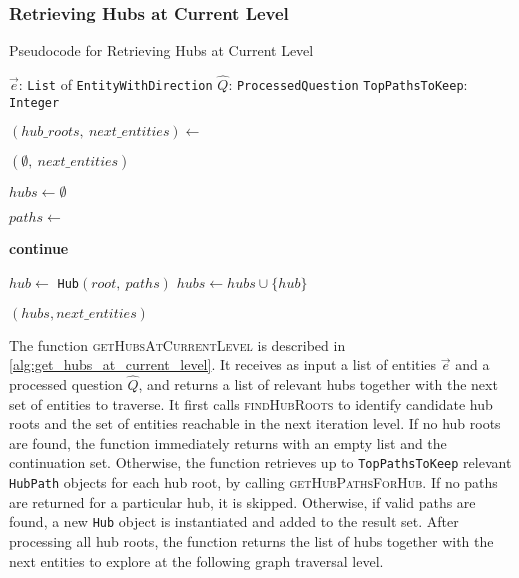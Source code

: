 \subsubsection{Retrieving Hubs at Current Level}

\begin{algorithm}[t]
\caption{Pseudocode for Retrieving Hubs at Current Level}
\label{alg:get_hubs_at_current_level}
\begin{algorithmic}[1]
\Require
    \Statex $\vec{e}$: \texttt{List} of \texttt{EntityWithDirection} 
    \Statex $\hat{Q}$: \texttt{ProcessedQuestion} 
    \Statex \texttt{TopPathsToKeep}: \texttt{Integer} 

\Statex
{}
    \State $(hub\_roots,\ next\_entities) \gets$ 

        \State \Return $(\emptyset,\ next\_entities)$
    \EndIf


    \State $hubs \gets \emptyset$ 

        \State $paths \gets$ 
        
            \State \textbf{continue} 
        \EndIf

        \State $hub \gets$ \texttt{Hub}$(root,\ paths)$ 
        \State $hubs \gets hubs \cup \{hub\}$ 
    \EndFor

    \State \Return $(hubs, next\_entities)$
\EndFunction
\end{algorithmic}
\end{algorithm}

The function \textsc{getHubsAtCurrentLevel} is described in \autoref{alg:get_hubs_at_current_level}. It receives as input a list of entities \(\vec{e}\) and a processed question \(\hat{Q}\), and returns a list of relevant hubs together with the next set of entities to traverse. It first calls \textsc{findHubRoots} to identify candidate hub roots and the set of entities reachable in the next iteration level. If no hub roots are found, the function immediately returns with an empty list and the continuation set. Otherwise, the function retrieves up to \texttt{TopPathsToKeep} relevant \texttt{HubPath} objects for each hub root, by calling \textsc{getHubPathsForHub}. If no paths are returned for a particular hub, it is skipped. Otherwise, if valid paths are found, a new \texttt{Hub} object is instantiated and added to the result set. After processing all hub roots, the function returns the list of hubs together with the next entities to explore at the following graph traversal level.

